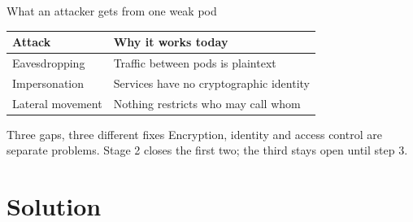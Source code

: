 \documentclass[9pt,aspectratio=169]{beamer}
\begin{document}
\begin{frame}{What an attacker gets from one weak pod}
  \centering
  \vspace{4pt}
  \begin{tabular}{ll}
    \toprule
    \textbf{Attack}  & \textbf{Why it works today} \\
    \midrule
    Eavesdropping    & Traffic between pods is plaintext \\
    Impersonation    & Services have no cryptographic identity \\
    Lateral movement & Nothing restricts who may call whom \\
    \bottomrule
  \end{tabular}

  \vspace{12pt}
  \begin{alertblock}{Three gaps, three different fixes}
    Encryption, identity and access control are separate problems. Stage 2
    closes the first two; the third stays open until step 3.
  \end{alertblock}
\end{frame}

\section{Solution}
\end{document}
